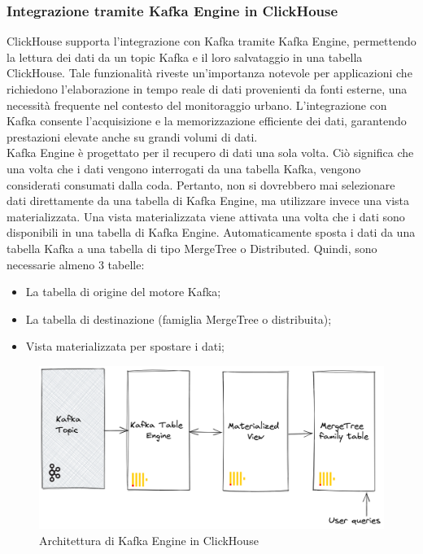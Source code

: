 \subsubsection{Integrazione tramite Kafka Engine in ClickHouse}\label{sec:kafka_engine}
ClickHouse supporta l'integrazione con Kafka tramite Kafka Engine, permettendo la lettura dei dati da un topic Kafka e il loro salvataggio in una tabella ClickHouse. Tale funzionalità riveste un'importanza notevole per applicazioni che richiedono l'elaborazione in tempo reale di dati provenienti da fonti esterne, una necessità frequente nel contesto del monitoraggio urbano. L'integrazione con Kafka consente l'acquisizione e la memorizzazione efficiente dei dati, garantendo prestazioni elevate anche su grandi volumi di dati.\\
Kafka Engine è progettato per il recupero di dati una sola volta. Ciò significa che una volta che i dati vengono interrogati da una tabella Kafka, vengono considerati consumati dalla coda. Pertanto, non si dovrebbero mai selezionare dati direttamente da una tabella di Kafka Engine, ma utilizzare invece una vista materializzata. Una vista materializzata viene attivata una volta che i dati sono disponibili in una tabella di Kafka Engine. Automaticamente sposta i dati da una tabella Kafka a una tabella di tipo MergeTree o Distributed. Quindi, sono necessarie almeno 3 tabelle:
\begin{itemize}
  \item La tabella di origine del motore Kafka;
  \item La tabella di destinazione (famiglia MergeTree o distribuita);
  \item Vista materializzata per spostare i dati;
\end{itemize}
\begin{figure}[H]
  \centering
  \includegraphics[width=.7\textwidth]{../Images/SpecificaTecnica/kafka_engine_architecture.png}
  \caption{Architettura di Kafka Engine in ClickHouse}
  \label{fig:sensorKafka}
\end{figure}

